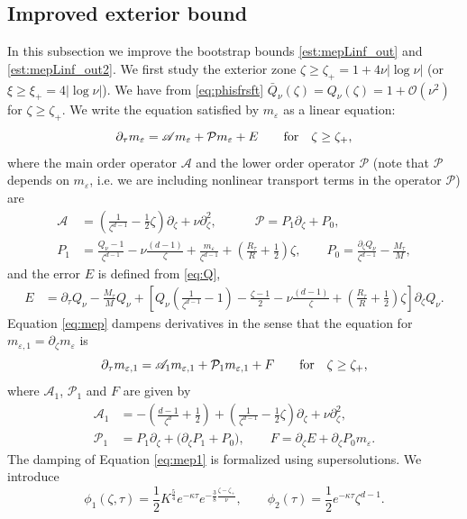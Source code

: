 \documentclass[11pt]{aims}
\theoremstyle{definition}
\newcommand{\ep}{\varepsilon}
\newcommand{\Oc}{\mathcal{O}}
\newcommand{\Pc}{\mathcal{P}}
\newcommand{\As}{\mathscr{A}}
\newcommand{\pa}{\partial}
\numberwithin{equation}{section}
\begin{document}
\subsection{Improved exterior bound}
In this subsection we improve the bootstrap bounds \eqref{est:mepLinf_out}  and \eqref{est:mepLinf_out2}. We first study the exterior zone $\zeta\geq \zeta_+=1+4\nu|\log \nu|$ (or $\xi\geq \xi_+=4|\log \nu|$). We have from \eqref{eq:phisfrsft}  $\bar Q_\nu(\zeta) =Q_\nu(\zeta) = 1 + \Oc(\nu^2)$ for $\zeta \geq \zeta_+$. We write the equation satisfied by $m_\ep$ as a linear equation: 
\begin{equation}\label{eq:mep}
\pa_\tau m_\ep = \As m_\ep + \Pc m_\ep + E \qquad \textup{for}\quad  \zeta \geq \zeta_+,
\end{equation}  
where the main order operator $\As$ and the lower order operator $\Pc $ (note that $\Pc $ depends on $m_\varepsilon$, i.e. we are including nonlinear transport terms in the operator $\Pc $) are
\begin{align}
\As &= \left( \frac{1}{\zeta^{d-1}} - \frac{1}{2}\zeta \right) \pa_\zeta   + \nu \pa_\zeta^2,  \qquad \quad \Pc = P_{1} \pa_\zeta + P_{0}, \label{def:AsPc}\\
P_{1} &= \frac{ Q_\nu - 1}{\zeta^{d-1}}  - \nu\frac{(d-1)}{\zeta}  + \frac{m_\ep}{\zeta^{d-1}} + \left(\frac{R_\tau}{R} + \frac{1}{2} \right) \zeta, \qquad P_{0}= \frac{\pa_\zeta Q_\nu}{\zeta^{d-1}} - \frac{M_\tau}{M}, \label{def:P1P0}
\end{align}
and the error $E$ is defined from \eqref{eq:Q}, 
\begin{align}
E&= \pa_\tau Q_\nu - \frac{M_\tau}{M} Q_\nu + \left[Q_\nu \left(\frac{1}{\zeta^{d-1}} -1\right)  - \frac{\zeta - 1}{2} -\nu\frac{(d-1)}{\zeta} + \left(\frac{R_\tau}{R} + \frac{1}{2} \right) \zeta \right]\pa_\zeta Q_\nu.\label{def:Eerror}
\end{align}
Equation \eqref{eq:mep} dampens derivatives in the sense that the equation for $m_{\ep, 1} = \pa_\zeta m_\ep$ is
\begin{equation}\label{eq:mep1}
\pa_\tau m_{\ep,1}= \As_1m_{\ep, 1} + \Pc_1 m_{\ep,1} + F \qquad \textup{for}\quad  \zeta \geq \zeta_+,
\end{equation}
where $\As_1$, $\Pc_1$ and $F$ are given by 
\begin{align}
\label{exterior:def:A1} \As_1  &=  - \left( \frac{d-1}{\zeta^{d}} + \frac{1}{2} \right) + \left(\frac{1}{\zeta^{d-1}} - \frac{1}{2}\zeta \right)\pa_\zeta  + \nu \pa_\zeta^2,\\
\label{exterior:def:P1} \Pc_1  &= P_1 \pa_\zeta + \big(\pa_\zeta P_{1} + P_0\big), \qquad F = \pa_\zeta E +\pa_\zeta P_0 m_\ep.
\end{align}
The damping of Equation \eqref{eq:mep1} is formalized using supersolutions. We introduce
\begin{equation} \label{exterior:def:phi1phi2}
\phi_1(\zeta, \tau) = \frac{1}{2} K^\frac{5}{4} e^{-\kappa \tau} e^{- \frac 38  \frac{\zeta -\zeta_+}{\nu}  }, \qquad \phi_2(\tau) = \frac{1}{2} e^{-\kappa \tau}\zeta^{d-1}.
\end{equation}
\end{document}
